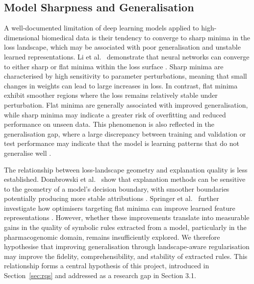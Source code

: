 \subsection{Model Sharpness and Generalisation}\label{sec:model-sharpness-generalisation}

A well-documented limitation of deep learning models applied to high-dimensional biomedical data is their tendency to converge to sharp minima in the loss landscape, which may be associated with poor generalisation and unstable learned representations. Li et al.\ \citeyearpar{li2018} demonstrate that neural networks can converge to either sharp or flat minima within the loss surface \citep{li2018}. Sharp minima are characterised by high sensitivity to parameter perturbations, meaning that small changes in weights can lead to large increases in loss. In contrast, flat minima exhibit smoother regions where the loss remains relatively stable under perturbation. Flat minima are generally associated with improved generalisation, while sharp minima may indicate a greater risk of overfitting and reduced performance on unseen data. This phenomenon is also reflected in the generalisation gap, where a large discrepancy between training and validation or test performance may indicate that the model is learning patterns that do not generalise well \citep{keskar2017}.

The relationship between loss-landscape geometry and explanation quality is less established. Dombrowski et al.\ \citeyearpar{dombrowski2019} show that explanation methods can be sensitive to the geometry of a model's decision boundary, with smoother boundaries potentially producing more stable attributions \citep{dombrowski2019}. Springer et al.\ \citeyearpar{springer2024} further investigate how optimisers targeting flat minima can improve learned feature representations \citep{springer2024}. However, whether these improvements translate into measurable gains in the quality of symbolic rules extracted from a model, particularly in the pharmacogenomic domain, remains insufficiently explored. We therefore hypothesise that improving generalisation through landscape-aware regularisation may improve the fidelity, comprehensibility, and stability of extracted rules. This relationship forms a central hypothesis of this project, introduced in Section~\ref{sec:rqs} and addressed as a research gap in Section 3.1.